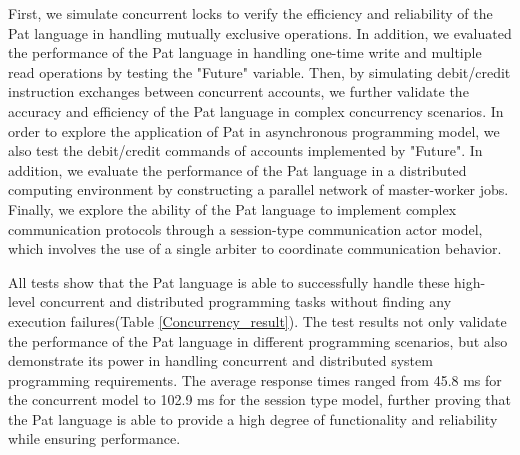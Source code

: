 \documentclass{l4proj}
\begin{document}
First, we simulate concurrent locks to verify the efficiency and reliability of the Pat language in handling mutually exclusive operations. In addition, we evaluated the performance of the Pat language in handling one-time write and multiple read operations by testing the "Future" variable. Then, by simulating debit/credit instruction exchanges between concurrent accounts, we further validate the accuracy and efficiency of the Pat language in complex concurrency scenarios. In order to explore the application of Pat in asynchronous programming model, we also test the debit/credit commands of accounts implemented by "Future". In addition, we evaluate the performance of the Pat language in a distributed computing environment by constructing a parallel network of master-worker jobs. Finally, we explore the ability of the Pat language to implement complex communication protocols through a session-type communication actor model, which involves the use of a single arbiter to coordinate communication behavior.

All tests show that the Pat language is able to successfully handle these high-level concurrent and distributed programming tasks without finding any execution failures(Table \ref{Concurrency_result}). The test results not only validate the performance of the Pat language in different programming scenarios, but also demonstrate its power in handling concurrent and distributed system programming requirements. The average response times ranged from 45.8 ms for the concurrent model to 102.9 ms for the session type model, further proving that the Pat language is able to provide a high degree of functionality and reliability while ensuring performance.
\begin{table}[ht]
\centering
\renewcommand{\arraystretch}{1.1}
\caption{Advanced Concurrency Model Correct Test Results \colorbox{yellow}{referenceHere}}
\label{Concurrency_result}
\end{table}
\end{document}
